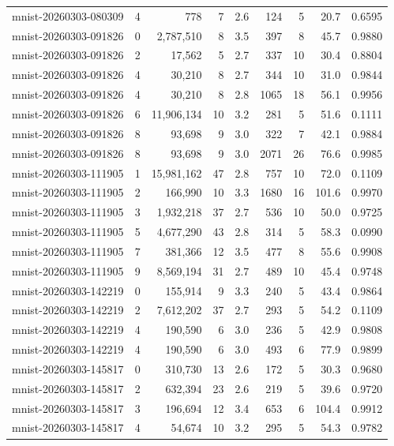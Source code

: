 \begin{tabular}{llrrrrrrr}
mnist-20260303-080309 & 4 & 778 & 7 & 2.6 & 124 & 5 & 20.7 & 0.6595 \\
mnist-20260303-091826 & 0 & 2,787,510 & 8 & 3.5 & 397 & 8 & 45.7 & 0.9880 \\
mnist-20260303-091826 & 2 & 17,562 & 5 & 2.7 & 337 & 10 & 30.4 & 0.8804 \\
mnist-20260303-091826 & 4 & 30,210 & 8 & 2.7 & 344 & 10 & 31.0 & 0.9844 \\
mnist-20260303-091826 & 4 & 30,210 & 8 & 2.8 & 1065 & 18 & 56.1 & 0.9956 \\
mnist-20260303-091826 & 6 & 11,906,134 & 10 & 3.2 & 281 & 5 & 51.6 & 0.1111 \\
mnist-20260303-091826 & 8 & 93,698 & 9 & 3.0 & 322 & 7 & 42.1 & 0.9884 \\
mnist-20260303-091826 & 8 & 93,698 & 9 & 3.0 & 2071 & 26 & 76.6 & 0.9985 \\
mnist-20260303-111905 & 1 & 15,981,162 & 47 & 2.8 & 757 & 10 & 72.0 & 0.1109 \\
mnist-20260303-111905 & 2 & 166,990 & 10 & 3.3 & 1680 & 16 & 101.6 & 0.9970 \\
mnist-20260303-111905 & 3 & 1,932,218 & 37 & 2.7 & 536 & 10 & 50.0 & 0.9725 \\
mnist-20260303-111905 & 5 & 4,677,290 & 43 & 2.8 & 314 & 5 & 58.3 & 0.0990 \\
mnist-20260303-111905 & 7 & 381,366 & 12 & 3.5 & 477 & 8 & 55.6 & 0.9908 \\
mnist-20260303-111905 & 9 & 8,569,194 & 31 & 2.7 & 489 & 10 & 45.4 & 0.9748 \\
mnist-20260303-142219 & 0 & 155,914 & 9 & 3.3 & 240 & 5 & 43.4 & 0.9864 \\
mnist-20260303-142219 & 2 & 7,612,202 & 37 & 2.7 & 293 & 5 & 54.2 & 0.1109 \\
mnist-20260303-142219 & 4 & 190,590 & 6 & 3.0 & 236 & 5 & 42.9 & 0.9808 \\
mnist-20260303-142219 & 4 & 190,590 & 6 & 3.0 & 493 & 6 & 77.9 & 0.9899 \\
mnist-20260303-145817 & 0 & 310,730 & 13 & 2.6 & 172 & 5 & 30.3 & 0.9680 \\
mnist-20260303-145817 & 2 & 632,394 & 23 & 2.6 & 219 & 5 & 39.6 & 0.9720 \\
mnist-20260303-145817 & 3 & 196,694 & 12 & 3.4 & 653 & 6 & 104.4 & 0.9912 \\
mnist-20260303-145817 & 4 & 54,674 & 10 & 3.2 & 295 & 5 & 54.3 & 0.9782 \\
\bottomrule
\end{tabular}